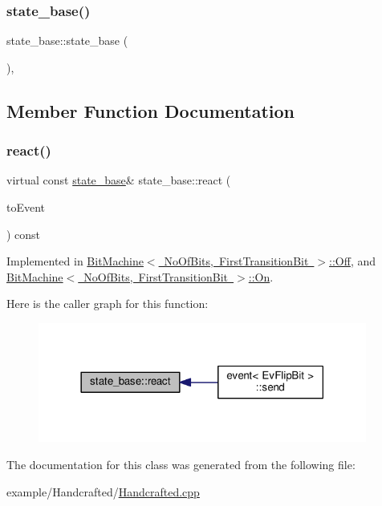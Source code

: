 \subsubsection{\texorpdfstring{state\+\_\+base()}{state\_base()}}
{\footnotesize\ttfamily state\+\_\+base\+::state\+\_\+base (\begin{DoxyParamCaption}{ }\end{DoxyParamCaption})\hspace{0.3cm}{\ttfamily [inline]}, {\ttfamily [protected]}}



\subsection{Member Function Documentation}
\mbox{\label{classstate__base_a2ee5b06850f92dd17ff82907bed15308}} 
\subsubsection{\texorpdfstring{react()}{react()}}
{\footnotesize\ttfamily virtual const \mbox{\hyperlink{classstate__base}{state\+\_\+base}}\& state\+\_\+base\+::react (\begin{DoxyParamCaption}\item[{const \mbox{\hyperlink{struct_ev_flip_bit}{Ev\+Flip\+Bit}} \&}]{to\+Event }\end{DoxyParamCaption}) const\hspace{0.3cm}{\ttfamily [pure virtual]}}



Implemented in \mbox{\hyperlink{struct_bit_machine_1_1_off_ae42704b63f585da48706638ad75ca3fb}{Bit\+Machine$<$ No\+Of\+Bits, First\+Transition\+Bit $>$\+::\+Off}}, and \mbox{\hyperlink{struct_bit_machine_1_1_on_a8ec83d08486a1e75c988953e882f8f7f}{Bit\+Machine$<$ No\+Of\+Bits, First\+Transition\+Bit $>$\+::\+On}}.

Here is the caller graph for this function\+:
\nopagebreak
\begin{figure}[H]
\begin{center}
\leavevmode
\includegraphics[width=306pt]{classstate__base_a2ee5b06850f92dd17ff82907bed15308_icgraph}
\end{center}
\end{figure}


The documentation for this class was generated from the following file\+:\begin{DoxyCompactItemize}
\item 
example/\+Handcrafted/\mbox{\hyperlink{_handcrafted_8cpp}{Handcrafted.\+cpp}}\end{DoxyCompactItemize}
